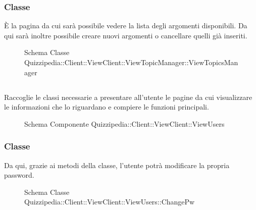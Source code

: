\subsubsection{Classe }
È la pagina da cui sarà possibile vedere la lista degli argomenti disponibili. Da qui sarà inoltre possibile creare nuovi argomenti o cancellare quelli già inseriti.
\begin{figure}[H]
\centering
\noindent{}
\caption[Schema Classe ViewTopicsManager]{Schema Classe Quizzipedia::Client::ViewClient::ViewTopicManager::ViewTopicsManager}
\end{figure}
\subsection{}
Raccoglie le classi necessarie a presentare all'utente le pagine da cui visualizzare le informazioni che lo riguardano e compiere le funzioni principali.
\begin{figure}[H]
\centering
\noindent{}
\caption[Schema Componente Quizzipedia::Client::ViewClient::ViewUsers]{Schema Componente Quizzipedia::Client::ViewClient::ViewUsers}
\end{figure}
\subsubsection{Classe }
Da qui, grazie ai metodi della classe, l'utente potrà modificare la propria password.
\begin{figure}[H]
\centering
\noindent{}
\caption[Schema Classe ChangePw]{Schema Classe Quizzipedia::Client::ViewClient::ViewUsers::ChangePw}
\end{figure}
